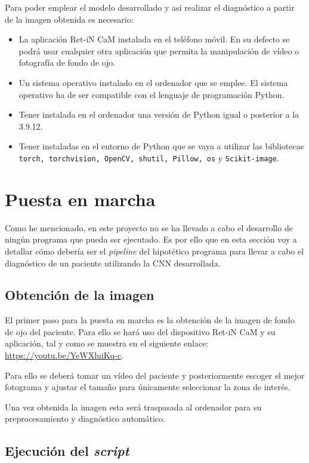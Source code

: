 Para poder emplear el modelo desarrollado y así realizar el diagnóstico a partir de la imagen obtenida es necesario:

\begin{itemize}
    \item La aplicación Ret-iN CaM instalada en el teléfono móvil. En su defecto se podrá usar cualquier otra aplicación que permita la manipulación de vídeo o fotografía de fondo de ojo.
    \item Un sistema operativo instalado en el ordenador que se emplee. El sistema operativo ha de ser compatible con el lenguaje de programación Python.
    \item Tener instalada en el ordenador una versión de Python igual o posterior a la 3.9.12.
    \item Tener instaladas en el entorno de Python que se vaya a utilizar las bibliotecas \texttt{torch, torchvision, OpenCV, shutil, Pillow, os} y \texttt{Scikit-image}.
\end{itemize}

\section{Puesta en marcha}

Como he mencionado, en este proyecto no se ha llevado a cabo el desarrollo de ningún programa que pueda ser ejecutado. Es por ello que en esta sección voy a detallar cómo debería ser el \textit{pipeline} del hipotético programa para llevar a cabo el diagnóstico de un paciente utilizando la CNN desarrollada.

\subsection{Obtención de la imagen}

El primer paso para la puesta en marcha es la obtención de la imagen de fondo de ojo del paciente. Para ello se hará uso del dispositivo Ret-iN CaM y su aplicación, tal y como se muestra en el siguiente enlace: \url{https://youtu.be/YeWXluiKq-c}. 

Para ello se deberá tomar un vídeo del paciente y posteriormente escoger el mejor fotograma y ajustar el tamaño para únicamente seleccionar la zona de interés.

Una vez obtenida la imagen esta será traspasada al ordenador para su preprocesamiento y diagnóstico automático.

\subsection{Ejecución del \textit{script}}

